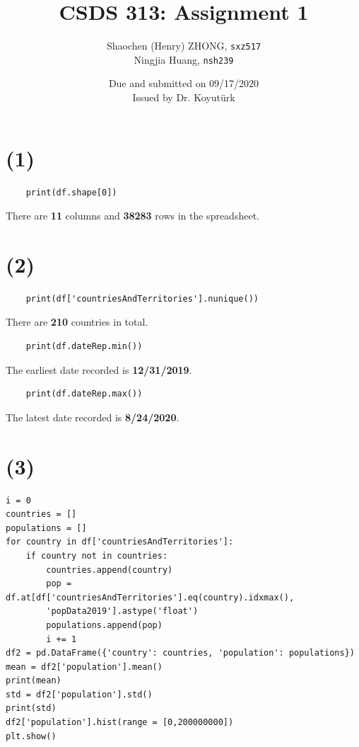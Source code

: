\documentclass[12pt]{article}
\newcommand{\ilc}{\texttt}
\begin{document}
\title{\textbf{CSDS 313: Assignment 1}}

\author{Shaochen (Henry) ZHONG, \ilc{sxz517} \\Ningjia Huang, \ilc{nsh239}}
\date{Due and submitted on 09/17/2020 \\ Issued by Dr. Koyut{\"u}rk}
\maketitle




\section*{(1)}
\begin{lstlisting}
    print(df.shape[0])
\end{lstlisting}

There are \textbf{11} columns and \textbf{38283} rows in the spreadsheet.

\section*{(2)}
\begin{lstlisting}
    print(df['countriesAndTerritories'].nunique())
\end{lstlisting}

There are \textbf{210} countries in total.

\begin{lstlisting}
    print(df.dateRep.min())
\end{lstlisting}

The earliest date recorded is \textbf{12/31/2019}.

\begin{lstlisting}
    print(df.dateRep.max())
\end{lstlisting}

The latest date recorded is \textbf{8/24/2020}.

\section*{(3)}
\begin{lstlisting}
i = 0
countries = []
populations = []
for country in df['countriesAndTerritories']:
    if country not in countries:
        countries.append(country)
        pop = df.at[df['countriesAndTerritories'].eq(country).idxmax(),
        'popData2019'].astype('float')
        populations.append(pop)
        i += 1
df2 = pd.DataFrame({'country': countries, 'population': populations})
mean = df2['population'].mean()
print(mean)
std = df2['population'].std()
print(std)
df2['population'].hist(range = [0,200000000])
plt.show()
\end{lstlisting}
\end{document}
